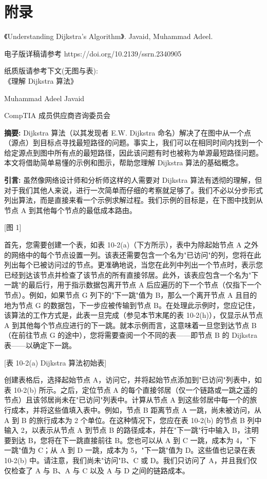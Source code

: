 \documentclass[12pt,a4paper,oneside,UTF8]{ctexart}
\begin{document}
\newpage\section{附录}
《Understanding Dijkstra's Algorithm》. Javaid, Muhammad Adeel. 

电子版详稿请参考 https://doi.org/10.2139/ssrn.2340905

纸质版请参考下文(无图与表):
~\\

《理解 Dijkstra 算法》

Muhammad Adeel Javaid

CompTIA 成员供应商咨询委员会

{\bf 摘要:}
Dijkstra 算法（以其发现者 E.W. Dijkstra 命名）解决了在图中从一个点（源点）到目标点寻找最短路径的问题。事实上，我们可以在相同时间内找到一个给定源点到图中所有点的最短路径，因此该问题有时也被称为单源最短路径问题。本文将借助简单易懂的示例和图示，帮助您理解 Dijkstra 算法的基础概念。

{\bf 引言:}
虽然像网络设计师和分析师这样的人需要对 Dijkstra 算法有透彻的理解，但对于我们其他人来说，进行一次简单而仔细的考察就足够了。我们不必以分步形式列出算法，而是直接来看一个示例求解过程。我们示例的目标是，在下图中找到从节点 A 到其他每个节点的最低成本路由。

[图 1]

首先，您需要创建一个表，如表 10-2(a)（下方所示），表中为除起始节点 A 之外的网络中的每个节点设置一列。该表还需要包含一个名为"已访问"的列，您将在此列出每个已被访问过的节点。更准确地说，当您在此列中列出一个节点时，表示您已经到达该节点并检查了该节点的所有直接邻居。此外，该表应包含一个名为"下一跳"的最后行，用于指示数据包离开节点 A 后应遍历的下一个节点（仅指下一个节点）。例如，如果节点 G 列下的"下一跳"值为 B，那么一个离开节点 A 且目的地为节点 G 的数据包，下一步应被传输到节点 B。在处理此示例时，您应记住，该算法的工作方式是，此表一旦完成（参见本节末尾的表 10-2(h)），仅显示从节点 A 到其他每个节点应进行的下一跳。就本示例而言，这意味着一旦您到达节点 B（在前往节点 G 的途中），您将需要查阅一个不同的表——即节点 B 的 Dijkstra 表——以确定下一跳。

[表 10-2(a) Dijkstra 算法初始表]

创建表格后，选择起始节点 A，访问它，并将起始节点添加到"已访问"列表中，如表 10-2(b) 所示。之后，定位节点 A 的每个直接邻居（仅一个链路或一跳之遥的节点）且该邻居尚未在"已访问"列表中。计算从节点 A 到这些邻居中每一个的旅行成本，并将这些值填入表中。例如，节点 B 距离节点 A 一跳，尚未被访问，从 A 到 B 的旅行成本为 2 个单位。在这种情况下，您应在表 10-2(b) 的节点 B 列中输入 2，以表示从节点 A 到节点 B 的路径成本，并在"下一跳"行中输入 B，注明要到达 B，您将在下一跳直接前往 B。您也可以从 A 到 C 一跳，成本为 4，"下一跳"值为 C；从 A 到 D 一跳，成本为 5，"下一跳"值为 D。这些值也记录在表 10-2(b) 中。请注意，我们尚未"访问"B、C 或 D。我们只访问了 A，并且我们仅仅检查了 A 与 B、A 与 C 以及 A 与 D 之间的链路成本。
\end{document}
